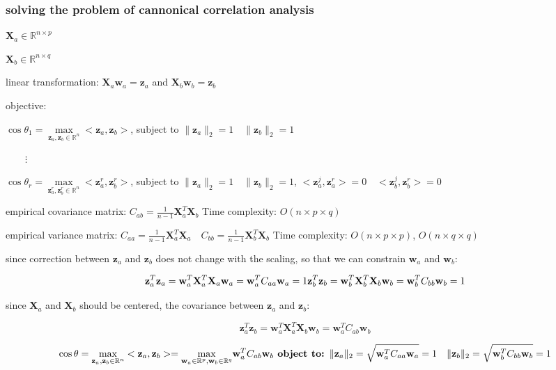\subsubsection{solving the problem of cannonical correlation analysis}

$\mathbf{X}_a\in \mathbb{R}^{n\times p}$

$\mathbf{X}_b\in \mathbb{R}^{n\times q}$

linear transformation: $\mathbf{X}_a{\mathbf w}_a={\mathbf z}_a$ and $\mathbf{X}_b{\mathbf w}_b={\mathbf z}_b$ 

objective:

$\cos \theta_1 = \underset{{\mathbf z}_a, {\mathbf z}_b \in\mathbb{R}^n}{\max}<{\mathbf z}_a, {\mathbf z}_b>$, subject to  $\|{\mathbf z}_a\|_2=1\quad \|{\mathbf z}_b\|_2=1$

$\qquad{\vdots}$

$\cos \theta_r = \underset{{\mathbf z}_a^r, {\mathbf z}_b^r \in\mathbb{R}^n}{\max}<{\mathbf z}_a^r, {\mathbf z}_b^r>$, subject to  $\|{\mathbf z}_a\|_2=1\quad \|{\mathbf z}_b\|_2=1$, $<{\mathbf z}_a^j, {\mathbf z}_a^r>=0\quad<{\mathbf z}_b^j, {\mathbf z}_b^r>=0$



empirical covariance matrix:  $C_{ab}=\frac{1}{n-1}\mathbf{X}_a^T\mathbf{X}_b$    Time complexity: $O(n\times p \times q)$

empirical variance matrix: $C_{aa}=\frac{1}{n-1}\mathbf{X}_a^T\mathbf{X}_a\quad C_{bb}=\frac{1}{n-1}\mathbf{X}_b^T\mathbf{X}_b$       Time complexity: $O(n\times p \times p)$,  $O(n\times q \times q)$

since correction between ${\mathbf z}_a$ and ${\mathbf z}_b$ does not change with the scaling, so that we can constrain ${\mathbf w}_a$ and ${\mathbf w}_b$:

$$
{\mathbf z}_a^T{\mathbf z}_a={\mathbf w}_a^T\mathbf{X}_a^T\mathbf{X}_a{\mathbf w}_a={\mathbf w}_a^T C_{aa}{\mathbf w}_a=1\\
{\mathbf z}_b^T{\mathbf z}_b={\mathbf w}_b^T\mathbf{X}_b^T\mathbf{X}_b{\mathbf w}_b={\mathbf w}_b^T C_{bb}{\mathbf w}_b=1
$$




since $\mathbf{X}_a$ and $\mathbf{X}_b$ should be centered, the covariance between  ${\mathbf z}_a$ and ${\mathbf z}_b$:

$$
{\mathbf z}_a^T{\mathbf z}_b={\mathbf w}_a^T\mathbf{X}_a^T\mathbf{X}_b{\mathbf w}_b={\mathbf w}_a^T C_{ab}{\mathbf w}_b
$$

$$
\cos \theta=\underset{{\mathbf z}_a, {\mathbf z}_b \in\mathbb{R}^n}{\max}<{\mathbf z}_a, {\mathbf z}_b>=\underset{{\mathbf w}_a\in \mathbb{R}^p, {\mathbf w}_b \in\mathbb{R}^q}{\max} {\mathbf w}_a^T C_{ab}{\mathbf w}_b\\
\textbf{ object to:  }  \|{\mathbf z}_a\|_2=\sqrt{{\mathbf w}_a^T C_{aa}{\mathbf w}_a}=1\quad \|{\mathbf z}_b\|_2=\sqrt{{\mathbf w}_b^T C_{bb}{\mathbf w}_b}=1
$$



